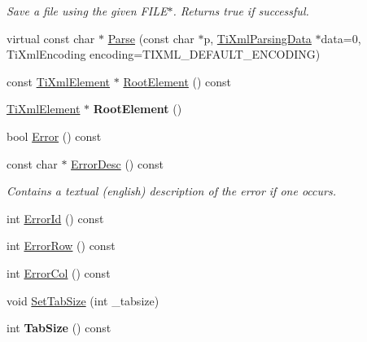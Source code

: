 \begin{DoxyCompactItemize}
\begin{DoxyCompactList}\small\item\em \-Save a file using the given \-F\-I\-L\-E$\ast$. \-Returns true if successful. \end{DoxyCompactList}\item 
virtual const char $\ast$ \hyperlink{class_ti_xml_document_a789ad2f06f93d52bdb5570b2f3670289}{\-Parse} (const char $\ast$p, \hyperlink{class_ti_xml_parsing_data}{\-Ti\-Xml\-Parsing\-Data} $\ast$data=0, \-Ti\-Xml\-Encoding encoding=\-T\-I\-X\-M\-L\-\_\-\-D\-E\-F\-A\-U\-L\-T\-\_\-\-E\-N\-C\-O\-D\-I\-N\-G)
\item 
const \hyperlink{class_ti_xml_element}{\-Ti\-Xml\-Element} $\ast$ \hyperlink{class_ti_xml_document_ad09d17927f908f40efb406af2fb873be}{\-Root\-Element} () const 
\item 
\hypertarget{class_ti_xml_document_a0b43e762a23f938b06651bc90b8a1013}{
\hyperlink{class_ti_xml_element}{\-Ti\-Xml\-Element} $\ast$ {\bfseries \-Root\-Element} ()}
\label{class_ti_xml_document_a0b43e762a23f938b06651bc90b8a1013}

\item 
bool \hyperlink{class_ti_xml_document_a6dfc01a6e5d58e56acd537dfd3bdeb29}{\-Error} () const 
\item 
\hypertarget{class_ti_xml_document_a9d0f689f6e09ea494ea547be8d79c25e}{
const char $\ast$ \hyperlink{class_ti_xml_document_a9d0f689f6e09ea494ea547be8d79c25e}{\-Error\-Desc} () const }
\label{class_ti_xml_document_a9d0f689f6e09ea494ea547be8d79c25e}

\begin{DoxyCompactList}\small\item\em \-Contains a textual (english) description of the error if one occurs. \end{DoxyCompactList}\item 
int \hyperlink{class_ti_xml_document_af96fc2f3f9ec6422782bfe916c9e778f}{\-Error\-Id} () const 
\item 
int \hyperlink{class_ti_xml_document_af30efc75e804aa2e92fb8be3a8cb676e}{\-Error\-Row} () const 
\item 
int \hyperlink{class_ti_xml_document_aa90bc630ee5203c6109ca5fad3323649}{\-Error\-Col} () const 
\item 
void \hyperlink{class_ti_xml_document_a51dac56316f89b35bdb7d0d433ba988e}{\-Set\-Tab\-Size} (int \-\_\-tabsize)
\item 
\hypertarget{class_ti_xml_document_a612360241b85bad0826b2a9ae9cda561}{
int {\bfseries \-Tab\-Size} () const }
\label{class_ti_xml_document_a612360241b85bad0826b2a9ae9cda561}


\end{DoxyCompactItemize}
